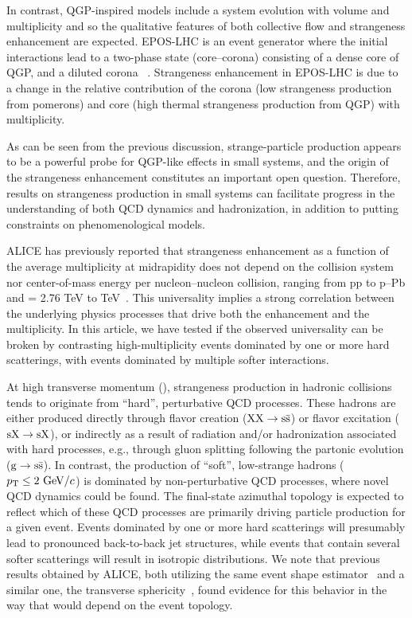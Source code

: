 In contrast, QGP-inspired models include a system evolution with volume and multiplicity and so the qualitative features of both collective flow and strangeness enhancement are expected. EPOS-LHC is an event generator where the initial interactions lead to a two-phase state (core--corona) consisting of a dense core of QGP, and a diluted corona ~\cite{EPOS-LHC}. Strangeness enhancement in EPOS-LHC is due to a change in the relative contribution of the corona (low strangeness production from pomerons) and core (high thermal strangeness production from QGP) with multiplicity.

As can be seen from the previous discussion, strange-particle production
appears to be a powerful probe for QGP-like effects in small systems, and the origin of the
strangeness enhancement constitutes an important open question. Therefore, results on strangeness production in small systems can facilitate progress in the understanding of both QCD dynamics and hadronization, in addition to putting constraints on phenomenological models.

ALICE has previously reported that strangeness enhancement as a function of the average multiplicity at midrapidity does not depend on the collision system nor center-of-mass energy per nucleon--nucleon collision, ranging from pp to p--Pb and \snn = 2.76 TeV to  TeV~\cite{13tevvsmultpapers}. This universality implies a strong correlation between the underlying physics processes that drive both the enhancement and the multiplicity. In this article, we have tested if the observed universality can be broken by contrasting high-multiplicity events dominated by one or more hard scatterings, with events dominated by multiple softer interactions.

At high transverse momentum (\pt), strangeness production in hadronic collisions tends to originate from “hard'', perturbative QCD processes. These hadrons are either produced directly through flavor creation ($\rm XX \rightarrow \rm s\bar{s}$) or flavor excitation ($\rm{s}X \rightarrow \rm{s}X$), or indirectly as a result of radiation and/or hadronization associated with hard processes, e.g., through gluon splitting following the partonic evolution ($\rm g \rightarrow s\bar{s}$). In contrast, the production of “soft'', low-\pt strange hadrons ($p_{\rm T} \leq 2~{\rm GeV}/c$) is dominated by non-perturbative QCD processes, where novel QCD dynamics could be found. The final-state azimuthal topology is expected to reflect which of these QCD processes are primarily driving particle production for a given event. Events dominated by one or more hard scatterings will presumably lead to pronounced back-to-back jet structures, while events that contain several softer scatterings will result in isotropic distributions. We note that previous results obtained by ALICE, both utilizing the same event shape estimator~\cite{ALICE:2019dfi} and a similar one, the transverse sphericity~\cite{ALICE:2012cor}, found evidence for this behavior in the way that \meanpt would depend on the event topology. 


